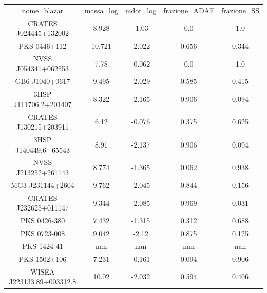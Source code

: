 \begin{table}
\begin{tabular}{ccccc}
nome_blazar & massa_log & mdot_log & frazione_ADAF & frazione_SS \\
CRATES J024445+132002 & 8.928 & -1.03 & 0.0 & 1.0 \\
PKS 0446+112 & 10.721 & -2.022 & 0.656 & 0.344 \\
NVSS J054341+062553 & 7.78 & -0.062 & 0.0 & 1.0 \\
GB6 J1040+0617 & 9.495 & -2.029 & 0.585 & 0.415 \\
3HSP J111706.2+201407 & 8.322 & -2.165 & 0.906 & 0.094 \\
CRATES J130215+203911 & 6.12 & -0.076 & 0.375 & 0.625 \\
3HSP J140449.6+65543 & 8.91 & -2.137 & 0.906 & 0.094 \\
NVSS J213252+261143 & 8.774 & -1.365 & 0.062 & 0.938 \\
MG3 J231144+2604 & 9.762 & -2.045 & 0.844 & 0.156 \\
CRATES J232625+011147 & 9.344 & -2.085 & 0.969 & 0.031 \\
PKS 0426-380 & 7.432 & -1.315 & 0.312 & 0.688 \\
PKS 0723-008 & 9.042 & -2.12 & 0.875 & 0.125 \\
PKS 1424-41 & nan & nan & nan & nan \\
PKS 1502+106 & 7.231 & -0.161 & 0.094 & 0.906 \\
WISEA J223133.89+003312.8 & 10.02 & -2.032 & 0.594 & 0.406 \\
\end{tabular}
\end{table}
